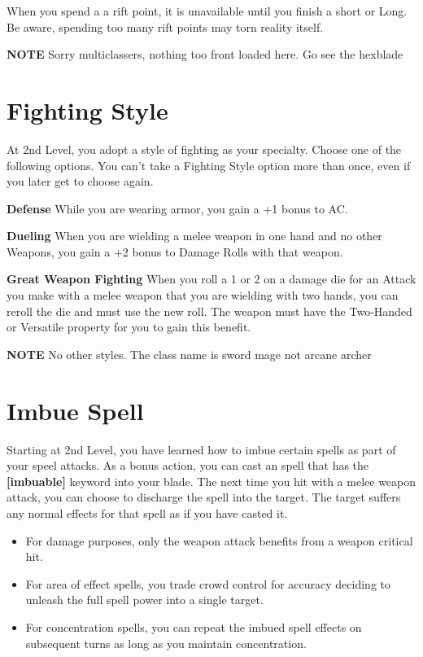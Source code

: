 \begin{multicols*}{2}
When you spend a a rift point, it is unavailable until you finish a short or Long. Be aware, spending too many rift points may torn reality itself. 

\smallskip

{\color{red} \textbf{NOTE} Sorry multiclassers, nothing too front loaded here. Go see the hexblade}
   
\section*{Fighting Style} 

At 2nd Level, you adopt a style of fighting as your specialty. Choose one of the following options. You can’t take a Fighting Style option more than once, even if you later get to choose again.

\textbf{Defense}
While you are wearing armor, you gain a +1 bonus to AC.

\textbf{Dueling}
When you are wielding a melee weapon in one hand and no other Weapons, you gain a +2 bonus to Damage Rolls with that weapon.

\textbf{Great Weapon Fighting}
When you roll a 1 or 2 on a damage die for an Attack you make with a melee weapon that you are wielding with two hands, you can reroll the die and must use the new roll. The weapon must have the Two-Handed or Versatile property for you to gain this benefit.

\smallskip

{\color{red} \textbf{NOTE} No other styles. The class name is sword mage not arcane archer }


    

\section*{Imbue Spell}

Starting at 2nd Level, you have learned how to imbue certain spells as part of your speel attacks. 
As a bonus action, you can cast an spell that has the \textbf{[imbuable]} keyword into your blade.
The next time you hit with a melee weapon attack, you can choose to discharge the spell into the target. 
The target suffers any normal effects for that spell as if you have casted it. 


\begin{itemize}
    \item For damage purposes, only the weapon attack benefits from a weapon critical hit.
    \item For area of effect spells, you trade crowd control for accuracy deciding to unleash the full spell power into a single target.
    \item For concentration spells, you can repeat the imbued spell effects on subsequent turns as long as you maintain concentration.
\end{itemize}





\end{multicols*}
